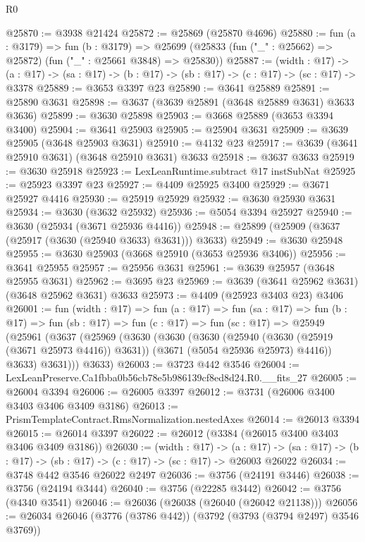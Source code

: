\begin{lexlean}{R0}
\begin{coremodule}
@25870 := @3938 @21424
@25872 := @25869 (@25870 @4696)
@25880 := fun (a : @3179) =>
  fun (b : @3179) =>
  @25699 (@25833 (fun ("_" : @25662) => @25872) (fun ("_" : @25661 @3848) => @25830))
@25887 := (width : @17) ->
  (a : @17) -> (sa : @17) -> (b : @17) -> (sb : @17) -> (c : @17) -> (sc : @17) -> @3378
@25889 := @3653 @3397 @23
@25890 := @3641 @25889
@25891 := @25890 @3631
@25898 := @3637 (@3639 @25891 (@3648 @25889 @3631) @3633 @3636)
@25899 := @3630 @25898
@25903 := @3668 @25889 (@3653 @3394 @3400)
@25904 := @3641 @25903
@25905 := @25904 @3631
@25909 := @3639 @25905 (@3648 @25903 @3631)
@25910 := @4132 @23
@25917 := @3639 (@3641 @25910 @3631) (@3648 @25910 @3631) @3633
@25918 := @3637 @3633
@25919 := @3630 @25918
@25923 := LexLeanRuntime.subtract @17 instSubNat
@25925 := @25923 @3397 @23
@25927 := @4409 @25925 @3400
@25929 := @3671 @25927 @4416
@25930 := @25919 @25929
@25932 := @3630 @25930 @3631
@25934 := @3630 (@3632 @25932)
@25936 := @5054 @3394 @25927
@25940 := @3630 (@25934 (@3671 @25936 @4416))
@25948 := @25899 (@25909 (@3637 (@25917 (@3630 (@25940 @3633) @3631))) @3633)
@25949 := @3630 @25948
@25955 := @3630 @25903 (@3668 @25910 (@3653 @25936 @3406))
@25956 := @3641 @25955
@25957 := @25956 @3631
@25961 := @3639 @25957 (@3648 @25955 @3631)
@25962 := @3695 @23
@25969 := @3639 (@3641 @25962 @3631) (@3648 @25962 @3631) @3633
@25973 := @4409 (@25923 @3403 @23) @3406
@26001 := fun (width : @17) =>
  fun (a : @17) =>
  fun (sa : @17) =>
  fun (b : @17) =>
  fun (sb : @17) =>
  fun (c : @17) =>
  fun (sc : @17) =>
  @25949
    (@25961
      (@3637
        (@25969
          (@3630
            (@3630
              (@3630
                (@25940 (@3630 (@25919 (@3671 @25973 @4416)) @3631))
                (@3671 (@5054 @25936 @25973) @4416))
              @3633)
            @3631)))
      @3633)
@26003 := @3723 @442 @3546
@26004 := LexLeanPreserve.Ca1fbba0b56cb78e5b986139cf8ed8d24.R0.__fits_27
@26005 := @26004 @3394
@26006 := @26005 @3397
@26012 := @3731 (@26006 @3400 @3403 @3406 @3409 @3186)
@26013 := PrismTemplateContract.RmsNormalization.nestedAxes
@26014 := @26013 @3394
@26015 := @26014 @3397
@26022 := @26012 (@3384 (@26015 @3400 @3403 @3406 @3409 @3186))
@26030 := (width : @17) ->
  (a : @17) -> (sa : @17) -> (b : @17) -> (sb : @17) -> (c : @17) -> (sc : @17) -> @26003 @26022
@26034 := @3748 @442 @3546 @26022 @2497
@26036 := @3756 (@24191 @3446)
@26038 := @3756 (@24194 @3444)
@26040 := @3756 (@22285 @3442)
@26042 := @3756 (@4340 @3541)
@26046 := @26036 (@26038 (@26040 (@26042 @21138)))
@26056 := @26034 @26046 (@3776 (@3786 @442)) (@3792 (@3793 (@3794 @2497) @3546 @3769))

\end{coremodule}
\end{lexlean}
